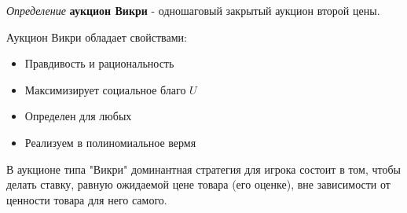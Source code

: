 
\textit{Определение} \textbf{аукцион Викри} - одношаговый закрытый аукцион второй цены.

Аукцион Викри обладает свойствами:

\begin{itemize}
    \item Правдивость и рациональность
    \item Максимизирует социальное благо $U$
    \item Определен для любых
    \item Реализуем в полиномиальное вермя
\end{itemize}


В аукционе типа "Викри" доминантная стратегия для игрока состоит в том, чтобы делать ставку, равную ожидаемой цене товара (его оценке), вне зависимости от ценности товара для него самого.




